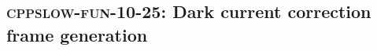 \subsection{\textsc{cppslow-fun-10-25}: Dark current correction frame generation}
\label{cppslow-fun-10-25}
